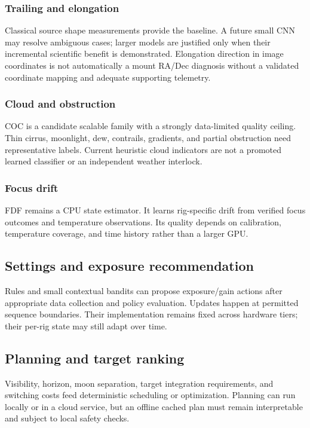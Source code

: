 \documentclass[11pt,a4paper]{article}
\begin{document}
\subsubsection{Trailing and elongation}
Classical source shape measurements provide the baseline. A future small CNN
may resolve ambiguous cases; larger models are justified only when their
incremental scientific benefit is demonstrated. Elongation direction in image
coordinates is not automatically a mount RA/Dec diagnosis without a validated
coordinate mapping and adequate supporting telemetry.

\subsubsection{Cloud and obstruction}
COC is a candidate scalable family with a strongly data-limited quality ceiling.
Thin cirrus, moonlight, dew, contrails, gradients, and partial obstruction need
representative labels. Current heuristic cloud indicators are not a promoted
learned classifier or an independent weather interlock.

\subsubsection{Focus drift}
FDF remains a CPU state estimator. It learns rig-specific drift from verified
focus outcomes and temperature observations. Its quality depends on calibration,
temperature coverage, and time history rather than a larger GPU.

\subsection{Settings and exposure recommendation}
Rules and small contextual bandits can propose exposure/gain actions after
appropriate data collection and policy evaluation. Updates happen at permitted
sequence boundaries. Their implementation remains fixed across hardware tiers;
their per-rig state may still adapt over time.

\subsection{Planning and target ranking}
Visibility, horizon, moon separation, target integration requirements, and
switching costs feed deterministic scheduling or optimization. Planning can
run locally or in a cloud service, but an offline cached plan must remain
interpretable and subject to local safety checks.
\end{document}
